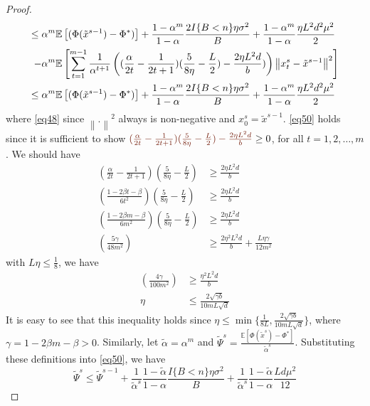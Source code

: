 \documentclass{article}
\newcommand*{\E}{\mathbb{E}}
\newcommand{\norm}[1]{\left\lVert#1\right\rVert}
\theoremstyle{definition}
\theoremstyle{remark}
\begin{document}
\begin{proof}
{\begin{align}
\leq\alpha^m\E&\left[(\Phi(\tilde{x}^{s-1}) - \Phi^*)\right] + \frac{1-\alpha^m}{1-\alpha}\frac{2I\{B < n\}\eta \sigma ^2}{B}+\frac{1-\alpha^m}{1-\alpha}\frac{\eta L^2 d^2 \mu^2}{2}\notag
\\-\alpha^m\E&\left[\sum_{t=1}^{m-1}\frac{1}{\alpha^{t+1}}\left((\frac{\alpha}{2t} - \frac{1}{2t+1})(\frac{5}{8\eta} - \frac{L}{2})-\frac{2\eta L^2 d}{b})\right) \norm{x_{t}^s-\tilde{x}^{s-1}}^2 \right]\notag\\
\leq\alpha^m\E&\left[(\Phi(\tilde{x}^{s-1}) - \Phi^*)\right] + \frac{1-\alpha^m}{1-\alpha}\frac{2I\{B < n\}\eta \sigma ^2}{B}+\frac{1-\alpha^m}{1-\alpha}\frac{\eta L^2 d^2 \mu^2}{2}\label{eq50}
\end{align}
}
where \eqref{eq48} since $\norm{.}^2$ always is non-negative and $x_0^s=\tilde{x}^{s-1}$. \eqref{eq50} holds since it is sufficient to show ${\color{Brown} (\frac{\alpha}{2t} - \frac{1}{2t+1})(\frac{5}{8\eta} - \frac{L}{2})- \frac{2\eta L^2 d}{b}} \geq 0$, for all $t=1, 2,\ldots, m$. 
{\color{red}
We should have
\begin{equation}
\begin{split}
(\frac{\alpha}{2t} - \frac{1}{2t+1})(\frac{5}{8\eta} - \frac{L}{2})&\geq \frac{2\eta L^2 d}{b}\\
(\frac{1-2\beta t-\beta}{6t^2})(\frac{5}{8\eta} - \frac{L}{2}) & \geq \frac{2\eta L^2 d}{b}\\
(\frac{1-2\beta m-\beta}{6m^2})(\frac{5}{8\eta} - \frac{L}{2}) & \geq \frac{2\eta L^2 d}{b}\\
(\frac{5\gamma}{48m^2}) & \geq \frac{2\eta^2 L^2 d}{b} +  \frac{L\eta\gamma}{12m^2}
\end{split}
\end{equation}
with $L\eta\leq \frac{1}{8}$, we have 
\begin{equation}
\begin{split}
(\frac{4\gamma}{100 m^2}) & \geq \frac{\eta^2 L^2 d}{b}\\
\eta &\leq \frac{2\sqrt{\gamma b}}{10 m L \sqrt{d}} 
\end{split}
\end{equation} 
}
It is easy to see that this inequality holds since $\eta \leq \min\{\frac{1}{8L}, \frac{2\sqrt{\gamma b}}{10 m L \sqrt{d}}\}$, where $\gamma = 1-2\beta m-\beta > 0$. Similarly, let  $\tilde{\alpha} = \alpha^m$ and $\tilde{\Psi}^s = \frac{\E[\Phi(\tilde{x}^{s})-\Phi^*]}{\tilde{\alpha}^s}$. Substituting these definitions into \eqref{eq50}, we have
{\color{Brown}
\begin{equation}\label{eq51}
\widetilde{\Psi}^s \leq \widetilde{\Psi}^{s-1} + \frac{1}{\tilde{\alpha}^s} \frac{1-\tilde{\alpha}}{1-{\alpha}}\frac{I\{B < n\}\eta \sigma ^2}{B}+ \frac{1}{\tilde{\alpha}^s} \frac{1-\tilde{\alpha}}{1-{\alpha}}\frac{L d \mu^2}{12}

\end{equation}}
\end{proof}
\end{document}
